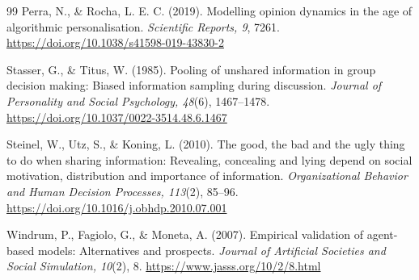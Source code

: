 \documentclass[11pt,a4paper]{article}
\begin{document}
\begin{thebibliography}{99}
Perra, N., \& Rocha, L. E. C. (2019). Modelling opinion dynamics in the age of algorithmic personalisation. \textit{Scientific Reports, 9}, 7261. \url{https://doi.org/10.1038/s41598-019-43830-2}

Stasser, G., \& Titus, W. (1985). Pooling of unshared information in group decision making: Biased information sampling during discussion. \textit{Journal of Personality and Social Psychology, 48}(6), 1467--1478. \url{https://doi.org/10.1037/0022-3514.48.6.1467}

Steinel, W., Utz, S., \& Koning, L. (2010). The good, the bad and the ugly thing to do when sharing information: Revealing, concealing and lying depend on social motivation, distribution and importance of information. \textit{Organizational Behavior and Human Decision Processes, 113}(2), 85--96. \url{https://doi.org/10.1016/j.obhdp.2010.07.001}

Windrum, P., Fagiolo, G., \& Moneta, A. (2007). Empirical validation of agent-based models: Alternatives and prospects. \textit{Journal of Artificial Societies and Social Simulation, 10}(2), 8. \url{https://www.jasss.org/10/2/8.html}

\end{thebibliography}
\endgroup
\end{document}
